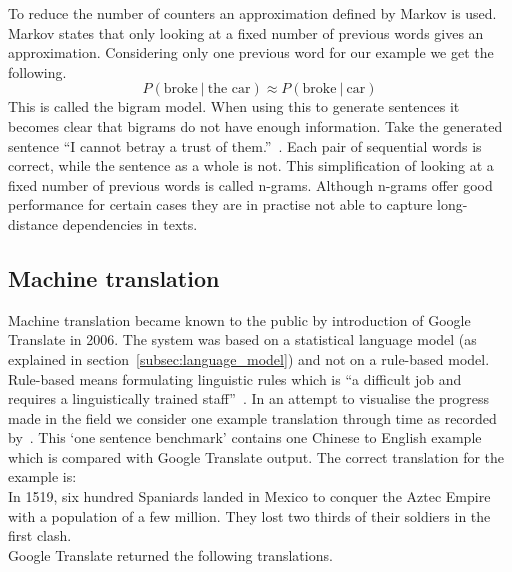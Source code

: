 To reduce the number of counters an approximation defined by Markov is used.
Markov states that only looking at a fixed number of previous words gives an approximation.
Considering only one previous word for our example we get the following.
\[ P(\text{broke} \: | \: \text{the car}) \approx P(\text{broke} \: | \: \text{car}) \]
This is called the bigram model.
When using this to generate sentences it becomes clear that bigrams do not have enough information.
Take the generated sentence ``I cannot betray a trust of them.''~\citep{langkilde1998practical}.
Each pair of sequential words is correct, while the sentence as a whole is not.
This simplification of looking at a fixed number of previous words is called n-grams.
Although n-grams offer good performance for certain cases they are in practise not able to capture long-distance dependencies in texts.

\subsection{Machine translation}
\label{subsec:mt}
Machine translation became known to the public by introduction of Google Translate in 2006.
The system was based on a statistical language model (as explained in section~\ref{subsec:language_model}) and not on a rule-based model.
Rule-based means formulating linguistic rules which is ``a difficult job and requires a linguistically trained staff''~\citep{sumita1991experiments}.
In an attempt to visualise the progress made in the field we consider one example translation through time as recorded by~\citet{manning2017lectures}.
This `one sentence benchmark' contains one Chinese to English example which is compared with Google Translate output.
The correct translation for the example is:\\

In 1519, six hundred Spaniards landed in Mexico to conquer the Aztec Empire with a population of a few million.
They lost two thirds of their soldiers in the first clash.\\

Google Translate returned the following translations.


